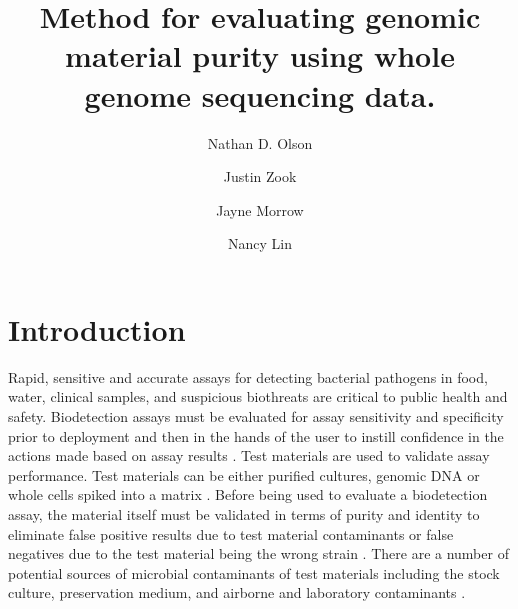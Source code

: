 \documentclass[fleqn,10pt,lineno]{wlpeerj}\usepackage[]{graphicx}\usepackage[]{color}
\title{Method for evaluating genomic material purity using whole genome sequencing data.}
\author[1]{Nathan D. Olson}
\author[1]{Justin Zook}
\author[1]{Jayne Morrow}
\author[1]{Nancy Lin}
\affil[1]{Material Measurement Laboratory, National Institute of Standards and Technology}
\begin{document}
\flushbottom
\maketitle
\thispagestyle{empty}

\section*{Introduction}
Rapid, sensitive and accurate assays for detecting bacterial pathogens in food, water, clinical samples, and suspicious biothreats are critical to public health and safety. 
Biodetection assays must be evaluated for assay sensitivity and specificity prior to deployment and then in the hands of the user to instill confidence in the actions made based on assay results \citep{Ieven2013,International2011,EPA2004,ISO/TS2010,Guide1998,Feldsine2002}. 
Test materials are used to validate assay performance.  Test materials can be either purified cultures, genomic DNA or whole cells spiked into a matrix \citep{EPA2004,ISO/TS2010,CLSI2010}. 
Before being used to evaluate a biodetection assay, the material itself must be validated in terms of purity and identity to eliminate false positive results due to test material contaminants or false negatives due to the test material being the wrong strain \citep{CLSI2010}. 
There are a number of potential sources of microbial contaminants of test materials including the stock culture, preservation medium, and airborne and laboratory contaminants \citep{Marron2013,Shrestha2013,Tanner1998}.   
\end{document}
